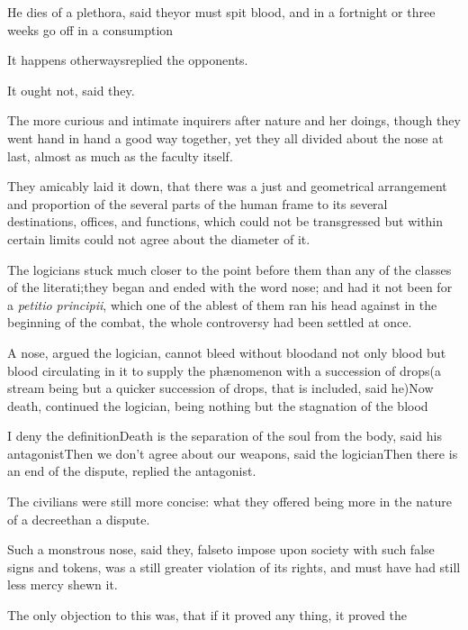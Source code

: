 \documentclass{article}
\begin{document}
He dies of a plethora, said they\tsk or must spit blood, and
in a fortnight or three weeks go off in a
consumption\tsk

\tsh It happens otherways\tsk replied the
opponents.\tsh

It ought not, said they.

The more curious and intimate inquirers after nature and her
doings, though they went hand in hand a good way together,
yet they all divided about the nose at last, almost as much
as the faculty itself.

They amicably laid it down, that there was a just and
geometrical arrangement and proportion of the several parts of the
human frame to its several destinations, offices, and functions,
which could not be transgressed but within certain
limits\break
{}
could not agree about the diameter of it.

The logicians stuck much closer to the point before them than
any of the classes of the literati;\tsh they began and
ended with the word nose; and had it not been for a \textit{petitio
principii}, which one of the ablest of them ran his head against
in the beginning of the combat, the whole controversy had been
settled at once.

A nose, argued the logician, cannot bleed without
blood\tsk and not only blood
\tsk but blood circulating in it to
supply the phænomenon with a succession of drops\tsk (a
stream being but a quicker succession of drops, that is included,
said he)\tsk Now death, continued the logician, being
nothing but the stagnation of the blood\tsh

I deny the definition\tsh Death is the separation of
the soul from the body, said his antagonist\tsk Then we
don’t agree about our weapons, said the
logician\tsk Then there is an end of the dispute, re\-plied the
antagonist.

The civilians were still more concise: what they offered being
more in the nature of a decree\tsk than a dispute.

\tsk Such a monstrous nose, said they, 
false\tsk to impose upon society with such false signs and
tokens, was a still greater violation of its rights, and must have
had still less mercy shewn it.

The only objection to this was, that\break
if it proved any thing, it proved the\break
{}
\end{document}
